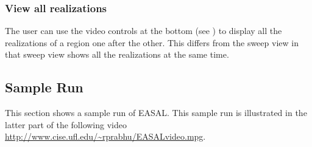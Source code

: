 \documentclass[10pt]{article}
\begin{document}
\subsubsection{View all realizations}
The user can use the video controls at the bottom (see
) to display all the realizations of a region one after
the other. This differs from the sweep view in that sweep view shows all the
realizations at the same time.




\subsection{Sample Run}
\label{sec:run}
This section shows a sample run of EASAL. This sample run is illustrated in the 
latter part of the following video 
\url{http://www.cise.ufl.edu/~rprabhu/EASALvideo.mpg}.
\end{document}
